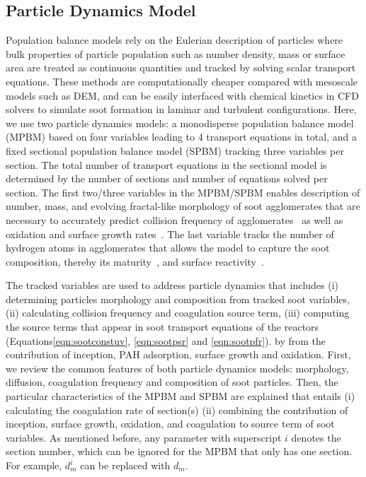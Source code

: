 \subsection{Particle Dynamics Model}
\label{sec:particledynamics}
Population balance models rely on the Eulerian description of particles where bulk properties of particle population such as number density, mass or surface area are treated as continuous quantities and tracked by solving scalar transport equations. These methods are computationally cheaper compared with mesoscale models such as DEM, and can be easily interfaced with chemical kinetics in CFD solvers to simulate soot formation in laminar and turbulent configurations. Here, we use two particle dynamics models: a monodisperse population balance model (MPBM) based on four variables leading to 4 transport equations in total, and a fixed sectional population balance model (SPBM) tracking three variables per section. The total number of transport equations in the sectional model is determined by the number of sections and number of equations solved per section. The first two/three variables in the MPBM/SPBM enables description of number, mass, and evolving fractal-like morphology of soot agglomerates that are necessary to accurately predict collision frequency of agglomerates~\citep{mulholland1988cluster} as well as oxidation and surface growth rates~\citep{kelesidis2019estimating}. The last variable tracks the number of hydrogen atoms in agglomerates that allows the model to capture the soot composition, thereby its maturity~\citep{kholghy2016core}, and surface reactivity~\citep{blanquart2009analyzing}.

  
The tracked variables are used to address particle dynamics that includes (i) determining particles morphology and composition from tracked soot variables, (ii) calculating collision frequency and coagulation source term, (iii) computing the source terms that appear in soot transport equations of the reactors (Equations\eqref{eqn:sootconstuv}, \eqref{eqn:sootpsr} and \eqref{eqn:sootpfr}). by from the contribution of inception, PAH adsorption, surface growth and oxidation. 
First, we review the common features of both particle dynamics models: morphology, diffusion, coagulation frequency and composition of soot particles. Then, the particular characteristics of the MPBM and SPBM are explained that entails (i) calculating the coagulation rate of section(s) (ii)  combining the contribution of inception, surface growth, oxidation, and coagulation to source term of soot variables. As mentioned before, any parameter with superscript $i$ denotes the section number, which can be ignored for the MPBM that only has one section. For example, ${d^i_m}$ can be replaced with ${d_m}$.


